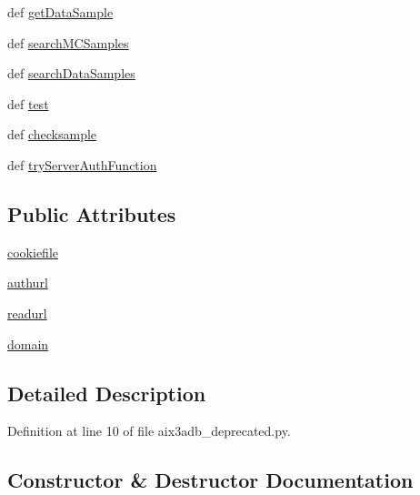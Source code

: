 \begin{DoxyCompactItemize}
\item 
def \hyperlink{classaix3adb__deprecated_1_1aix3adb_a0f34788c6db23908d08ae11dbfb2bfc4}{get\-Data\-Sample}
\item 
def \hyperlink{classaix3adb__deprecated_1_1aix3adb_ac3ec5ea0f57921411a94ad391ceee330}{search\-M\-C\-Samples}
\item 
def \hyperlink{classaix3adb__deprecated_1_1aix3adb_a0bf4b7cb55c37c80bb1d9ee81d0370bf}{search\-Data\-Samples}
\item 
def \hyperlink{classaix3adb__deprecated_1_1aix3adb_a6ad02de91c3d0b684964f90640f776a7}{test}
\item 
def \hyperlink{classaix3adb__deprecated_1_1aix3adb_af476d2c213a2be3ca8c556f4c2c41811}{checksample}
\item 
def \hyperlink{classaix3adb__deprecated_1_1aix3adb_a8485264e25b92d97c964786282453a74}{try\-Server\-Auth\-Function}
\end{DoxyCompactItemize}
\subsection*{Public Attributes}
\begin{DoxyCompactItemize}
\item 
\hyperlink{classaix3adb__deprecated_1_1aix3adb_af033ccecd5302312bf229a940130681c}{cookiefile}
\item 
\hyperlink{classaix3adb__deprecated_1_1aix3adb_a209888746b3f38a2eb924850a36fa81e}{authurl}
\item 
\hyperlink{classaix3adb__deprecated_1_1aix3adb_a7d22b98dfb97d1a16a75189765efea2c}{readurl}
\item 
\hyperlink{classaix3adb__deprecated_1_1aix3adb_a71fa095d2699a77af3fc32196db3c265}{domain}
\end{DoxyCompactItemize}


\subsection{Detailed Description}


Definition at line 10 of file aix3adb\-\_\-deprecated.\-py.



\subsection{Constructor \& Destructor Documentation}
